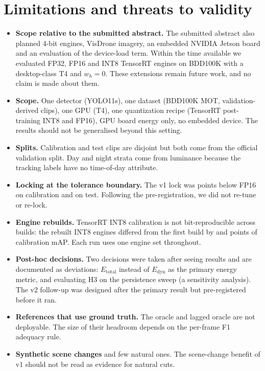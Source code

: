 \documentclass[pdflatex,sn-mathphys-num]{sn-jnl}
\begin{document}
\section{Limitations and threats to validity}\label{sec:limitations}
\begin{itemize}
\item \textbf{Scope relative to the submitted abstract.} The submitted abstract also planned 4-bit engines, VisDrone imagery, an embedded NVIDIA Jetson board and an evaluation of the device-load term. Within the time available we evaluated FP32, FP16 and INT8 TensorRT engines on BDD100K with a desktop-class T4 and $w_h = 0$. These extensions remain future work, and no claim is made about them.
\item \textbf{Scope.} One detector (YOLO11s), one dataset (BDD100K MOT, validation-derived clips), one GPU (T4), one quantization recipe (TensorRT post-training INT8 and FP16), GPU board energy only, no embedded device. The results should not be generalised beyond this setting.
\item \textbf{Splits.} Calibration and test clips are disjoint but both come from the official validation split. Day and night strata come from luminance because the tracking labels have no time-of-day attribute.
\item \textbf{Locking at the tolerance boundary.} The v1 lock was \CalibDropMain{} points below FP16 on calibration and \DropAdaptiveVsFPsixteen{} on test. Following the pre-registration, we did not re-tune or re-lock.
\item \textbf{Engine rebuilds.} TensorRT INT8 calibration is not bit-reproducible across builds: the rebuilt INT8 engines differed from the first build by \DriftINTeight{} and \VDriftINTeight{} points of calibration mAP. Each run uses one engine set throughout.
\item \textbf{Post-hoc decisions.} Two decisions were taken after seeing results and are documented as deviations: $E_{\text{total}}$ instead of $E_{\text{dyn}}$ as the primary energy metric, and evaluating H3 on the persistence sweep (a sensitivity analysis). The v2 follow-up was designed after the primary result but pre-registered before it ran.
\item \textbf{References that use ground truth.} The oracle and lagged oracle are not deployable. The size of their headroom depends on the per-frame F1 adequacy rule.
\item \textbf{Synthetic scene changes} and few natural ones. The scene-change benefit of v1 should not be read as evidence for natural cuts.
\end{itemize}
\end{document}
